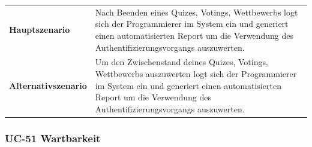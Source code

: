 \begin{longtable}[c]{@{}ll@{}}
\begin{minipage}[t]{0.34\columnwidth}\raggedright\strut
\textbf{Hauptszenario}
\strut\end{minipage} &
\begin{minipage}[t]{0.60\columnwidth}\raggedright\strut
Nach Beenden eines Quizes, Votings, Wettbewerbs logt sich der
Programmierer im System ein und generiert einen automatisierten Report
um die Verwendung des Authentifizierungsvorgangs auszuwerten.
\strut\end{minipage}\tabularnewline
\begin{minipage}[t]{0.34\columnwidth}\raggedright\strut
\textbf{Alternativszenario}
\strut\end{minipage} &
\begin{minipage}[t]{0.60\columnwidth}\raggedright\strut
Um den Zwischenstand deines Quizes, Votings, Wettbewerbs auszuwerten
logt sich der Programmierer im System ein und generiert einen
automatisierten Report um die Verwendung des Authentifizierungsvorgangs
auszuwerten.
\strut\end{minipage}\tabularnewline
\bottomrule
\end{longtable}

\subsubsection{UC-51 Wartbarkeit}\label{uc-51-wartbarkeit}

